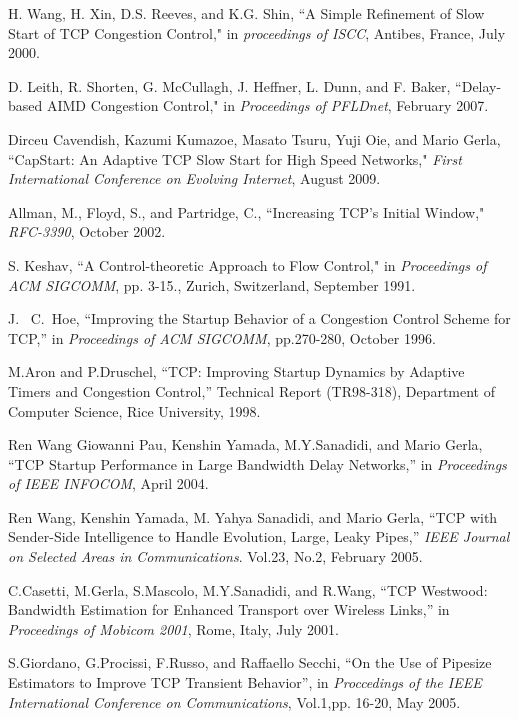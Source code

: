 \documentclass[12pt,onecolumn]{IEEEtran}
\begin{document}
\begin{thebibliography}{99}
H. Wang, H. Xin, D.S. Reeves, and K.G. Shin, ``A Simple Refinement of Slow Start of TCP Congestion Control," in \emph{proceedings of ISCC},
Antibes, France, July 2000.

D. Leith, R. Shorten, G. McCullagh, J. Heffner, L. Dunn, and F. Baker, ``Delay-based AIMD Congestion Control," in \emph{Proceedings of PFLDnet}, February 2007.


Dirceu Cavendish, Kazumi Kumazoe, Masato Tsuru, Yuji Oie, and Mario Gerla, ``CapStart: An Adaptive TCP Slow Start for High Speed Networks," \emph{First International Conference on Evolving Internet}, August 2009.



Allman, M., Floyd, S., and Partridge, C., ``Increasing TCP's Initial Window," \emph{RFC-3390}, October 2002.





S. Keshav, ``A Control-theoretic Approach to Flow Control," in \emph{Proceedings of ACM SIGCOMM}, pp. 3-15., Zurich, Switzerland, September 1991.


J. ~C.~Hoe, ``Improving the Startup Behavior of a Congestion Control Scheme for TCP,'' in \emph{Proceedings of ACM SIGCOMM}, pp.270-280, October 1996.

M.Aron and P.Druschel, ``TCP: Improving Startup Dynamics by Adaptive Timers and Congestion Control,'' Technical Report (TR98-318), Department of Computer Science, Rice University, 1998.

Ren Wang Giowanni Pau, Kenshin Yamada, M.Y.Sanadidi, and Mario Gerla, ``TCP Startup Performance in Large Bandwidth Delay Networks,''
in \emph{Proceedings of IEEE INFOCOM}, April 2004.

Ren Wang, Kenshin Yamada, M. Yahya Sanadidi, and Mario Gerla, ``TCP with Sender-Side Intelligence to Handle Evolution, Large, Leaky Pipes,'' \emph{IEEE Journal on Selected Areas in Communications}. Vol.23, No.2, February 2005.

C.Casetti, M.Gerla, S.Mascolo, M.Y.Sanadidi, and R.Wang, ``TCP Westwood: Bandwidth Estimation for Enhanced Transport over Wireless Links,''
in \emph{Proceedings of Mobicom 2001}, Rome, Italy, July 2001.

S.Giordano, G.Procissi, F.Russo, and Raffaello Secchi, ``On the Use of Pipesize Estimators to Improve TCP Transient Behavior'', in \emph{Proccedings of the IEEE International Conference on Communications}, Vol.1,pp. 16-20, May 2005.


\end{thebibliography}
\end{document}
